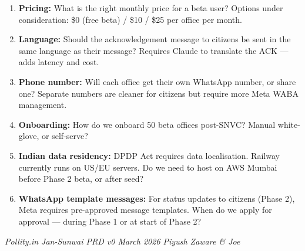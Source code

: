 \documentclass[11pt, a4paper]{article}
\begin{document}
\begin{enumerate}[leftmargin=1.5em]
  \item \textbf{Pricing:} What is the right monthly price for a beta user? Options under consideration: \$0 (free beta) / \$10 / \$25 per office per month.

  \item \textbf{Language:} Should the acknowledgement message to citizens be sent in the same language as their message? Requires Claude to translate the ACK --- adds latency and cost.

  \item \textbf{Phone number:} Will each office get their own WhatsApp number, or share one? Separate numbers are cleaner for citizens but require more Meta WABA management.

  \item \textbf{Onboarding:} How do we onboard 50 beta offices post-SNVC? Manual white-glove, or self-serve?

  \item \textbf{Indian data residency:} DPDP Act requires data localisation. Railway currently runs on US/EU servers. Do we need to host on AWS Mumbai before Phase 2 beta, or after seed?

  \item \textbf{WhatsApp template messages:} For status updates to citizens (Phase 2), Meta requires pre-approved message templates. When do we apply for approval --- during Phase 1 or at start of Phase 2?
\end{enumerate}

\vfill
\begin{center}
{\color{gray}\small\textit{Pollity.in \textbar{} Jan-Sunwai PRD v0 \textbar{} March 2026 \textbar{} Piyush Zaware \& Joe}}
\end{center}
\end{document}
